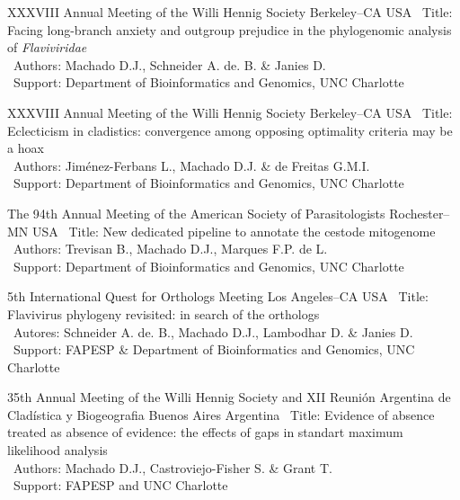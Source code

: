 	{XXXVIII Annual Meeting of the Willi Hennig Society}
	{Berkeley--CA}
	{USA}
	{}
	{
		\textbullet~Title: Facing long-branch anxiety and outgroup prejudice in the phylogenomic analysis of \emph{Flaviviridae}\\
		\textbullet~Authors: Machado D.J., Schneider A. de. B. \& Janies D.\\
		\textbullet~Support: Department of Bioinformatics and Genomics,  UNC Charlotte
	}

\vspace{.5em}

\cventry{---}
	{XXXVIII Annual Meeting of the Willi Hennig Society}
	{Berkeley--CA}
	{USA}
	{}
	{
		\textbullet~Title: Eclecticism in cladistics: convergence among opposing optimality criteria may be a hoax\\
		\textbullet~Authors: Jiménez-Ferbans L., Machado D.J. \& de Freitas G.M.I.\\ \textbullet~Support: Department of Bioinformatics and Genomics,  UNC Charlotte
	}

\vspace{.5em}

\cventry{---}
	{The 94th Annual Meeting of the American Society of Parasitologists}
	{Rochester--MN}
	{USA}
	{}
	{
		\textbullet~Title:  New dedicated pipeline to annotate the cestode mitogenome\\
		\textbullet~Authors: Trevisan B., Machado D.J., Marques F.P. de L.\\ \textbullet~Support: Department of Bioinformatics and Genomics,  UNC Charlotte
	}

\vspace{.5em}

	{5th International Quest for Orthologs Meeting}
	{Los Angeles--CA}
	{USA}
	{}
	{
		\textbullet~Title: Flavivirus phylogeny revisited: in search of the orthologs\\
		\textbullet~Autores: Schneider A. de. B., Machado D.J., Lambodhar D. \& Janies D.\\
		\textbullet~Support: FAPESP \& Department of Bioinformatics and Genomics,  UNC Charlotte
	}

\vspace{.5em}

	{35th Annual Meeting of the Willi Hennig Society and XII Reunión Argentina de Cladística y Biogeografia}
	{Buenos Aires}
	{Argentina}
	{}
	{
		\textbullet~Title: Evidence of absence treated as absence of evidence: the effects of gaps in standart maximum likelihood analysis\\
		\textbullet~Authors: Machado D.J., Castroviejo-Fisher S. \& Grant T.\\
		\textbullet~Support: FAPESP and UNC Charlotte
	}

